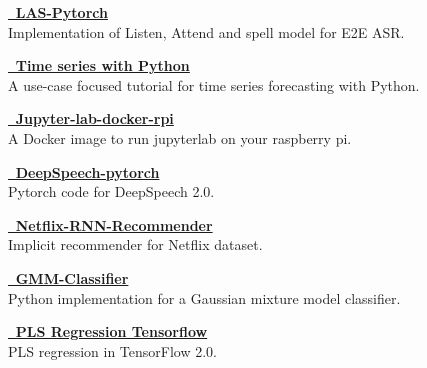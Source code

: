 



\textcolor{SlateGrey}{\textbf{\href{https://github.com/jiwidi/las-pytorch}{\faGithub \, LAS-Pytorch }}} \\ 
Implementation of Listen, Attend and spell model for E2E ASR.
\newline
\vspace{1pt}


\textcolor{SlateGrey}{\textbf{\href{https://github.com/jiwidi/time-series-forecasting-with-python}{\faGithub \,  Time series with Python  }}} \\ 
A use-case focused tutorial for time series forecasting with Python.
\newline
\vspace{1pt}


\textcolor{SlateGrey}{\textbf{\href{https://github.com/jiwidi/jupyter-lab-docker-rpi}{\faGithub \, Jupyter-lab-docker-rpi}}} \\ 
A Docker image to run jupyterlab on your raspberry pi. 
\newline
\vspace{1pt}


\textcolor{SlateGrey}{\textbf{\href{https://github.com/jiwidi/DeepSpeech-pytorch}{\faGithub \, DeepSpeech-pytorch}}} \\ 
Pytorch code for DeepSpeech 2.0.
\newline
\vspace{1pt}



\textcolor{SlateGrey}{\textbf{\href{https://github.com/jiwidi/Netflix-RNN-Recommender}{\faGithub \, Netflix-RNN-Recommender}}} \\ 
Implicit recommender for Netflix dataset.
\newline
\vspace{1pt}

\textcolor{SlateGrey}{\textbf{\href{https://github.com/jiwidi/gmm-classifier}{\faGithub \, GMM-Classifier}}} \\ 
Python implementation for a Gaussian mixture model classifier.
\newline
\vspace{1pt}

\textcolor{SlateGrey}{\textbf{\href{https://github.com/jiwidi/PLS-regression-tensorflow}{\faGithub \, PLS Regression Tensorflow}}} \\ 
PLS regression in TensorFlow 2.0.
\newline
\vspace{1pt}

